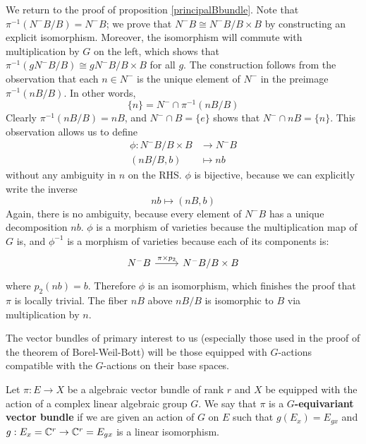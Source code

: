 We return to the proof of proposition \ref{principalBbundle}. Note that $\pi^{-1}(N^-B / B) = N^- B$; we prove
that $N^- B \cong N^-B / B \times B$ by constructing an explicit isomorphism. Moreover, the isomorphism will
commute with multiplication by $G$ on the left, which shows that $\pi^{-1}(gN^-B / B) \cong gN^-B / B \times B$
for all $g$. The construction follows from the observation that each $n\in N^-$ is the unique element
of $N^-$ in the preimage $\pi^{-1}(nB/B)$. In other words,
\begin{equation}
\label{uniquen}
\{n\} = N^- \cap \pi^{-1}(nB/B)
\end{equation}
Clearly $\pi^{-1}(nB/B) = nB$, and $N^- \cap B = \{e\}$ shows that $N^- \cap nB = \{n\}$. This observation allows
us to define
\begin{align*}
\phi : N^- B/B \times B &\to N^-B 	\\
(nB/B, b) &\mapsto nb
\end{align*}
without any ambiguity in $n$ on the RHS. $\phi$ is bijective, because we can explicitly write the inverse
\[	nb \mapsto (nB, b)	\]
Again, there is no ambiguity, because every element of $N^-B$ has a unique decomposition $nb$. $\phi$ is a morphism
of varieties because the multiplication map of $G$ is, and $\phi^{-1}$ is a morphism of varieties because each of its
components is:
\[
\begin{tikzcd}
N^-B \arrow{r}{\pi \times p_2} & N^-B/B \times B
\end{tikzcd}
\]
where $p_2(nb) = b$. Therefore $\phi$ is an isomorphism, which finishes the proof that $\pi$ is locally trivial. The
fiber $nB$ above $nB/B$ is isomorphic to $B$ via multiplication by $n$.


The vector bundles of primary interest to us (especially those used in the proof of the theorem of Borel-Weil-Bott)
will be those equipped with $G$-actions compatible with the $G$-actions on their base spaces.
\begin{definition}
    Let $\pi:E\to X$ be a algebraic vector bundle of rank $r$ and $X$ be equipped with the action of a complex
    linear algebraic group $G$. We say that $\pi$ is a \textbf{$G$-equivariant vector bundle} if 
    we are given an action of $G$ on $E$ such that $g(E_x)=E_{gx}$ and $g:E_x=\mathbb{C}^r\to \mathbb{C}^r=E_{gx}$ is a
    linear isomorphism.
\end{definition}

